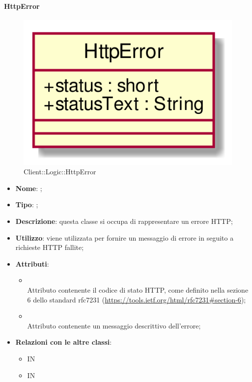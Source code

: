 \hypertarget{HttpError_label}{\paragraph{HttpError}}
\begin{figure}[h]
	\centering
	\includegraphics[width=\textwidth,height=\textheight,keepaspectratio]{images/ClassHttpError.png}
	\caption{Client::Logic::HttpError}
\end{figure}
\begin{itemize}
	\item \textbf{Nome}: ;
	\item \textbf{Tipo}: ;
	\item \textbf{Descrizione}: questa classe si occupa di rappresentare un errore HTTP;
	\item \textbf{Utilizzo}: viene utilizzata per fornire un messaggio di errore in seguito a richieste HTTP fallite;
	\item \textbf{Attributi}:
	\begin{itemize}
		\item[]  \\
		Attributo contenente il codice di stato HTTP, come definito nella sezione 6 dello standard rfc7231 (\url{https://tools.ietf.org/html/rfc7231#section-6});
		\item[]  \\
		Attributo contenente un messaggio descrittivo dell'errore;
	\end{itemize}
	\item \textbf{Relazioni con le altre classi}:
	\begin{itemize}
		\item IN \hyperlink{HttpPromise_label}{}
		\item IN \hyperlink{Logic_label}{}
	\end{itemize}
\end{itemize}

